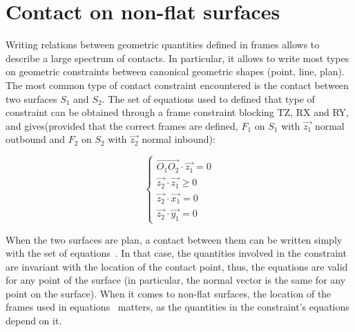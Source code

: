 
\section{Contact on non-flat surfaces}
\label{sec:contact_on_non_flat_surfaces}

Writing relations between geometric quantities defined in frames allows to describe a large spectrum of contacts.
In particular, it allows to write most types on geometric constraints between canonical geometric shapes (point, line, plan).
The most common type of contact constraint encountered is the contact between two surfaces $S_1$ and $S_2$.
The set of equations used to defined that type of constraint can be obtained through a frame constraint blocking TZ, RX and RY, and gives(provided that the correct frames are defined, $F_1$ on $S_1$ with $\vec{z_1}$ normal outbound and $F_2$ on $S_2$ with $\vec{z_2}$ normal inbound):

\begin{equation}
  \left\{
  \begin{array}{ll}
    \overrightarrow{O_1O_2}\cdot\vec{z_1} = 0\\
    \vec{z_2}\cdot\vec{z_1} \geq 0 \\
    \vec{z_2}\cdot\vec{x_1} = 0 \\
    \vec{z_2}\cdot\vec{y_1} = 0
  \end{array}
  \right.
\label{eq:planar_contact}
\end{equation}

When the two surfaces are plan, a contact between them can be written simply with the set of equations~.
In that case, the quantities involved in the constraint are invariant with the location of the contact point, thus, the equations are valid for any point of the surface (in particular, the normal vector is the same for any point on the surface).
When it comes to non-flat surfaces, the location of the frames used in equations~ matters, as the quantities in the constraint's equations depend on it.

